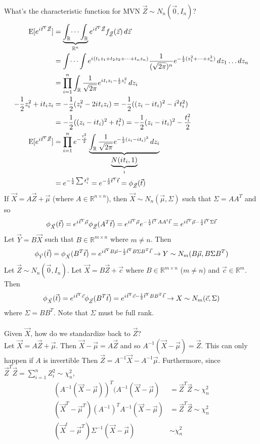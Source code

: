 \documentclass[12pt]{article}
\newcommand{\expected}[1]{\mathrm{E}[#1]}
\renewcommand{\i}{{i\mkern1mu}}
\begin{document}
What's the characteristic function for MVN $\vec{Z} \sim N_n(\vec{0}, I_n)$? 
$$ \begin{aligned} \expected{e^{\i \vec{t}^T \vec{Z}}} &= \underbrace{\int_{\mathbb{R}} \dots \int_{\mathbb{R}}}_{\mathbb{R}^n} e^{\i \vec{t}^T\vec{Z}} f_{\vec{Z}}(\vec{z}) \, d\vec{z} \\ &= \int \dots \int e^{\i (t_1z_1 + t_2z_2 + \dots + t_nz_n)} \frac{1}{(\sqrt{2\pi})^n} e^{-\frac{1}{2}(z_1^2 + \dots + z_n^2)} \, dz_1 \dots dz_n \\ &= \prod_{i=1}^n \int_{\mathbb{R}} \frac{1}{\sqrt{2\pi}} e^{\i t_iz_i - \frac{1}{2}z_i^2} \, dz_i \\ -\frac{1}{2}z_i^2 + \i t_iz_i &= -\frac{1}{2}(z_i^2 - 2\i t_iz_i) = -\frac{1}{2}((z_i - \i t_i)^2 - i^2t_i^2) \\ &= -\frac{1}{2}((z_i - \i t_i)^2 + t_i^2) = -\frac{1}{2}(z_i - \i t_i)^2 - \frac{t_i^2}{2} \\ \expected{e^{\i \vec{t}^T \vec{Z}}} &= \prod_{i=1}^n e^{-\frac{t_i^2}{2}} \underbrace{\int_{\mathbb{R}} \frac{1}{\sqrt{2\pi}} e^{-\frac{1}{2}(z_i - \i t_i)^2} \, dz_i}_{\underbrace{N(\i t_i, 1)}_{1}} \\ &= e^{-\frac{1}{2}\sum t_i^2} = e^{-\frac{1}{2}\vec{t}^T\vec{t}} = \phi_{\vec{Z}}(\vec{t}) \end{aligned} $$ 
If $\vec{X} = A\vec{Z} + \vec{\mu}$ (where $A \in \mathbb{R}^{n \times n}$), then $\vec{X} \sim N_n(\vec{\mu}, \Sigma)$ such that $\Sigma = AA^T$ and so $$ \phi_{\vec{X}}(\vec{t}) = e^{\i \vec{t}^T\vec{\mu}}\phi_{\vec{Z}}(A^T\vec{t}) = e^{\i \vec{t}^T\vec{\mu}} e^{-\frac{1}{2}\vec{t}^TAA^t\vec{t}} = e^{\i \vec{t}^T\vec{\mu} - \frac{1}{2}\vec{t}^T\Sigma\vec{t}}$$ 
Let $\vec{Y} = B\vec{X}$ such that $B \in \mathbb{R}^{m \times n}$ where $m \neq n$. Then 
$$ \phi_{\vec{Y}}(\vec{t}) = \phi_{\vec{X}}(B^T\vec{t}) = e^{\i \vec{t}^TB\vec{\mu} - \frac{1}{2}\vec{t}^TB\Sigma B^T\vec{t}} \to Y \sim N_m(B\vec{\mu}, B\Sigma B^T) $$ 
Let $\vec{Z} \sim N_n(\vec{0}, I_n)$. Let $\vec{X} = B\vec{Z} + \vec{c}$ where $B \in \mathbb{R}^{m \times n}$ ($m \neq n$) and $\vec{c} \in \mathbb{R}^m$. Then $$\phi_{\vec{X}}(\vec{t}) = e^{\i \vec{t}^T\vec{c}} \phi_{\vec{Z}}(B^T\vec{t}) = e^{\i \vec{t}^T\vec{c} - \frac{1}{2}\vec{t}^TBB^T\vec{t}} \to X \sim N_m(\vec{c}, \Sigma)$$ where $\Sigma = BB^T$. Note that $\Sigma$ must be full rank. \\~\\
Given $\vec{X}$, how do we standardize back to $\vec{Z}$? \\
Let $\vec{X} = A\vec{Z} + \vec{\mu}$. Then $\vec{X} - \vec{\mu} = A\vec{Z}$ and so $A^{-1}(\vec{X} - \vec{\mu}) = \vec{Z}$. This can only happen if $A$ is invertible Then $\vec{Z} = A^{-1}\vec{X} - A^{-1}\vec{\mu}$. Furthermore, since $\vec{Z}^T\vec{Z} = \sum_{i=1}^n Z_i^2 \sim \chi_n^2$, $$ \begin{aligned} 
(A^{-1}(\vec{X} - \vec{\mu}))^T(A^{-1}(\vec{X} - \vec{\mu}) &= \vec{Z}^T\vec{Z} \sim \chi^2_n \\ (\vec{X}^T - \vec{\mu}^T)(A^{-1})^TA^{-1}(\vec{X} - \vec{\mu}) &= \vec{Z}^T\vec{Z} \sim \chi^2_n \\ (\vec{X}^t - \vec{\mu}^T)\Sigma^{-1}(\vec{X} - \vec{\mu}) &\sim \chi^2_n \end{aligned} $$ 
\end{document}
